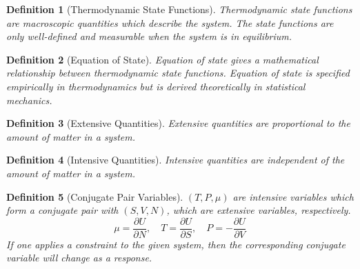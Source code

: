 \documentclass[a4paper]{article}
\theoremstyle{new}
\newtheorem{defi}{Definition}[section]
\begin{document}
\begin{defi}[Thermodynamic State Functions]
Thermodynamic state functions are macroscopic quantities which describe the system. The state functions are only well-defined and measurable when the system is in equilibrium.
\end{defi}
\begin{defi}[Equation of State]
Equation of state gives a mathematical relationship between thermodynamic state functions. Equation of state is specified empirically in thermodynamics but is derived theoretically in statistical mechanics.
\end{defi}
\begin{defi}[Extensive Quantities]
Extensive quantities are proportional to the amount of matter in a system.
\end{defi}
\begin{defi}[Intensive Quantities]
Intensive quantities are independent of the amount of matter in a system.
\end{defi}
\begin{defi}[Conjugate Pair Variables]
$(T,P,\mu)$ are intensive variables which form a conjugate pair with $(S,V,N)$, which are extensive variables, respectively.
$$\mu=\frac{\partial U}{\partial N},\quad T=\frac{\partial U}{\partial S},\quad P=-\frac{\partial U}{\partial V}$$
If one applies a constraint to the given system, then the corresponding conjugate variable will change as a response.
\end{defi}
\newpage
\end{document}

